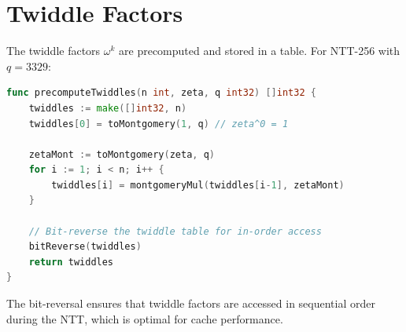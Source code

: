 \section{Twiddle Factors}


The twiddle factors $\omega^k$ are precomputed and stored in a table. For NTT-256 with
$q = 3329$:

\begin{lstlisting}[language=Go,caption={Twiddle factor precomputation}]
func precomputeTwiddles(n int, zeta, q int32) []int32 {
    twiddles := make([]int32, n)
    twiddles[0] = toMontgomery(1, q) // zeta^0 = 1

    zetaMont := toMontgomery(zeta, q)
    for i := 1; i < n; i++ {
        twiddles[i] = montgomeryMul(twiddles[i-1], zetaMont)
    }

    // Bit-reverse the twiddle table for in-order access
    bitReverse(twiddles)
    return twiddles
}
\end{lstlisting}

The bit-reversal ensures that twiddle factors are accessed in sequential order during the
NTT, which is optimal for cache performance.

